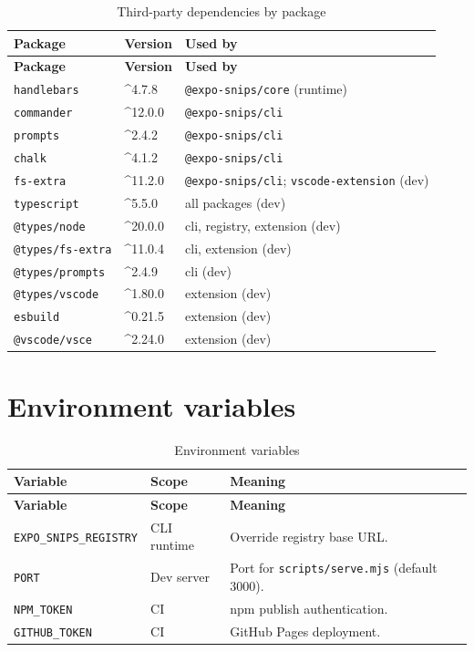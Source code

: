 \begin{longtable}{@{}L{4.6cm}L{2.8cm}L{6.8cm}@{}}
\caption{Third-party dependencies by package}\\
\toprule
\textbf{Package} & \textbf{Version} & \textbf{Used by} \\
\midrule
\endfirsthead
\toprule
\textbf{Package} & \textbf{Version} & \textbf{Used by} \\
\midrule
\endhead
\texttt{handlebars} & \^{}4.7.8 & \texttt{@expo-snips/core} (runtime) \\
\texttt{commander} & \^{}12.0.0 & \texttt{@expo-snips/cli} \\
\texttt{prompts} & \^{}2.4.2 & \texttt{@expo-snips/cli} \\
\texttt{chalk} & \^{}4.1.2 & \texttt{@expo-snips/cli} \\
\texttt{fs-extra} & \^{}11.2.0 & \texttt{@expo-snips/cli};
\texttt{vscode-extension} (dev) \\
\texttt{typescript} & \^{}5.5.0 & all packages (dev) \\
\texttt{@types/node} & \^{}20.0.0 & cli, registry, extension (dev) \\
\texttt{@types/fs-extra} & \^{}11.0.4 & cli, extension (dev) \\
\texttt{@types/prompts} & \^{}2.4.9 & cli (dev) \\
\texttt{@types/vscode} & \^{}1.80.0 & extension (dev) \\
\texttt{esbuild} & \^{}0.21.5 & extension (dev) \\
\texttt{@vscode/vsce} & \^{}2.24.0 & extension (dev) \\
\bottomrule
\end{longtable}

\section{Environment variables}

\begin{longtable}{@{}L{4.2cm}L{2.4cm}L{7.6cm}@{}}
\caption{Environment variables}\\
\toprule
\textbf{Variable} & \textbf{Scope} & \textbf{Meaning} \\
\midrule
\endfirsthead
\toprule
\textbf{Variable} & \textbf{Scope} & \textbf{Meaning} \\
\midrule
\endhead
\texttt{EXPO\_SNIPS\_REGISTRY} & CLI runtime & Override registry base URL. \\
\texttt{PORT} & Dev server & Port for \texttt{scripts/serve.mjs} (default 3000). \\
\texttt{NPM\_TOKEN} & CI & npm publish authentication. \\
\texttt{GITHUB\_TOKEN} & CI & GitHub Pages deployment. \\
\bottomrule
\end{longtable}

